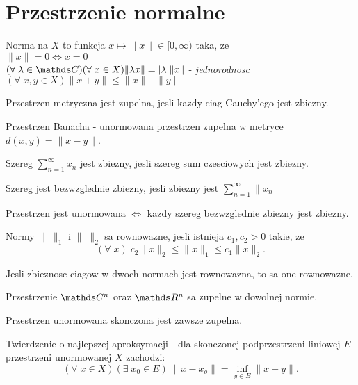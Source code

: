\section{Przestrzenie normalne}

\begin{multicols}{2}
    
    {\color{def}Norma} na $X$ to funkcja $x\mapsto \|x\|\in[0, \infty)$ taka, ze\smallskip\\
        \point $\|x\|=0\iff x=0$\smallskip\\
        \point $(\forall\;\lambda\in\C)(\forall\;x\in X) \|\lambda x\|=|\lambda|\|x\|$ - \emph{jednorodnosc}\smallskip\\
        \point $(\forall\;x,y\in X)\| x+y\|\leq \|x\|+\|y\|$
    \bigskip

    Przestrzen metryczna jest {\color{def}zupelna}, jesli kazdy ciag Cauchy'ego jest zbiezny.
    \medskip

    {\color{def}Przestrzen Banacha} - unormowana przestrzen zupelna w metryce $d(x, y)=\|x-y\|$.
    \bigskip

    \pdef

    Szereg $\sum\limits_{n=1}^\infty x_n$ jest {\color{acc}zbiezny}, jesli szereg sum czesciowych jest zbiezny.\\

    \kdef

    Szereg jest {\color{acc}bezwzglednie zbiezny}, jesli zbiezny jest $\sum\limits_{n=1}^\infty\|x_n\|$
    \medskip

    \pdef
    
    Przestrzen jest unormowana $\iff$ kazdy szereg bezwzglednie zbiezny jest zbiezny.


    \kdef
    \medskip

    Normy $\|\;\|_1$ i $\|\;\|_2$ sa {\color{def}rownowazne}, jesli istnieja $c_1, c_2>0$ takie, ze
    $$(\forall\;x)\;c_2\|x\|_2\leq \|x\|_1\leq c_1\|x\|_2.$$

    {\color{acc}\point} Jesli zbieznosc ciagow w dwoch normach jest rownowazna, to sa one rownowazne.

    {\color{acc}\point} Przestrzenie $\C^n$ oraz $\R^n$ sa zupelne w dowolnej normie.

    {\color{acc}\point} Przestrzen unormowana skonczona jest zawsze zupelna.
    \medskip

    {\color{def}Twierdzenie o najlepszej aproksymacji} - dla skonczonej podprzestrzeni liniowej $E$ przestrzeni unormowanej $X$ zachodzi:
    $$(\forall\;x\in X)(\exists\;x_0\in E)\;\|x-x_o\|=\inf\limits_{y\in E}\|x-y\|.$$


\end{multicols}
